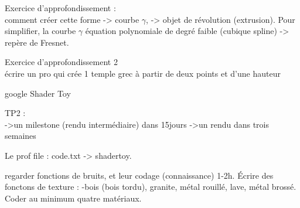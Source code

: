 Exercice d'approfondissement : \\
comment créer cette forme -> courbe $\gamma$, -> objet de révolution (extrusion). Pour simplifier, la courbe $\gamma$ équation polynomiale de degré faible (cubique spline) -> repère de Fresnet.

Exercice d'approfondissement 2\\
écrire un pro qui crée 1 temple grec à partir de deux points et d'une hauteur

google Shader Toy


\newpage
\vskip 3cm
TP2 : \\
->un milestone (rendu intermédiaire) dans 15jours
->un rendu dans trois semaines

Le prof file : code.txt -> shadertoy.

regarder fonctions de bruits, et leur codage (connaissance) 1-2h. Écrire des fonctons de texture : -bois (bois tordu), granite, métal rouillé, lave, métal brossé.
Coder au minimum quatre matériaux.

